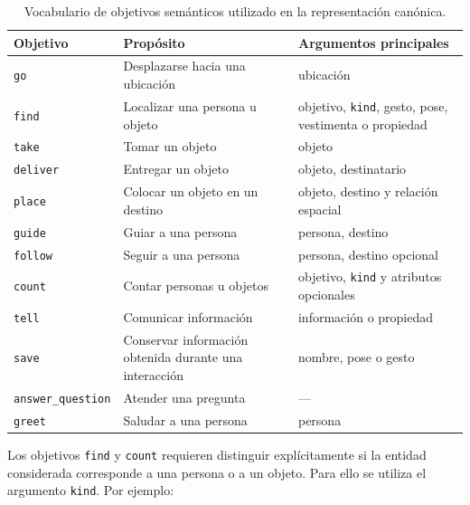 \begin{table}[htbp]
\centering
\caption{Vocabulario de objetivos semánticos utilizado en la representación canónica.}
\label{tab:vocabulario_goals}
\begin{tabular}{|p{}|p{}|p{}|}
\hline
\textbf{Objetivo} & \textbf{Propósito} & \textbf{Argumentos principales} \\
\hline

\texttt{go}
& Desplazarse hacia una ubicación
& ubicación \\
\hline

\texttt{find}
& Localizar una persona u objeto
& objetivo, \texttt{kind}, gesto, pose, vestimenta o propiedad \\
\hline

\texttt{take}
& Tomar un objeto
& objeto \\
\hline

\texttt{deliver}
& Entregar un objeto
& objeto, destinatario \\
\hline

\texttt{place}
& Colocar un objeto en un destino
& objeto, destino y relación espacial \\
\hline

\texttt{guide}
& Guiar a una persona
& persona, destino \\
\hline

\texttt{follow}
& Seguir a una persona
& persona, destino opcional \\
\hline

\texttt{count}
& Contar personas u objetos
& objetivo, \texttt{kind} y atributos opcionales \\
\hline

\texttt{tell}
& Comunicar información
& información o propiedad \\
\hline

\texttt{save}
& Conservar información obtenida durante una interacción
& nombre, pose o gesto \\
\hline

\texttt{answer\_\allowbreak question}
& Atender una pregunta
& --- \\
\hline

\texttt{greet}
& Saludar a una persona
& persona \\
\hline

\end{tabular}
\end{table}

Los objetivos \texttt{find} y \texttt{count} requieren distinguir
explícitamente si la entidad considerada corresponde a una persona o a un
objeto. Para ello se utiliza el argumento \texttt{kind}. Por ejemplo:

